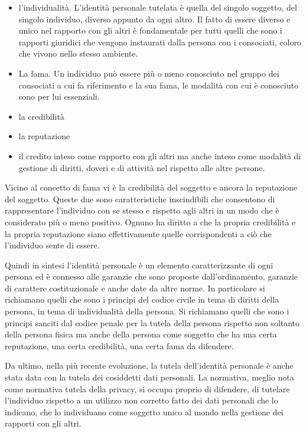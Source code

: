 \begin{itemize}
    \item l'individualità. L'identità personale tutelata è quella del singolo soggetto, del singolo individuo, diverso appunto da ogni altro. Il fatto di essere diverso e unico nel rapporto con gli altri è fondamentale per tutti quelli che sono i rapporti giuridici che vengono instaurati dalla persona con i consociati, coloro che vivono nello stesso ambiente.
    \item La fama. Un individuo può essere più o meno conosciuto nel gruppo dei consociati a cui fa riferimento e la sua fama, le modalità con cui è conosciuto sono per lui essenziali. 
    \item la credibilità
    \item la reputazione
    \item il credito inteso come rapporto con gli altri ma anche inteso come modalità di gestione di diritti, doveri e di attività nel rispetto alle altre persone.
\end{itemize}

Vicino al concetto di fama vi è la credibilità del soggetto e ancora la reputazione del soggetto. Queste due sono caratteristiche inscindibili che consentono di rappresentare l'individuo con se stesso e rispetto agli altri in un modo che è considerato più o meno positivo. Ognuno ha diritto a che la propria credibilità e la propria reputazione siano effettivamente quelle corrispondenti a ciò che l'individuo sente di essere.

Quindi in sintesi l'identità personale è un elemento caratterizzante di ogni persona ed è connesso alle garanzie che sono proposte dall'ordinamento, garanzie di carattere costituzionale e anche date da altre norme. In particolare si richiamano quelli che sono i principi del codice civile in tema di diritti della persona, in tema di individualità della persona. Si richiamano quelli che sono i principi sanciti dal codice penale per la tutela della persona rispetto non soltanto della persona fisica ma anche della persona come soggetto che ha una certa reputazione, una certa credibilità, una certa fama da difendere.

Da ultimo, nella più recente evoluzione, la tutela dell'identità personale è anche stata data con la tutela dei cosiddetti dati personali. La normativa, meglio nota come normativa tutela della privacy, si occupa proprio di difendere, di tutelare l'individuo rispetto a un utilizzo non corretto fatto dei dati personali che lo indicano, che lo individuano come soggetto unico al mondo nella gestione dei rapporti con gli altri.

